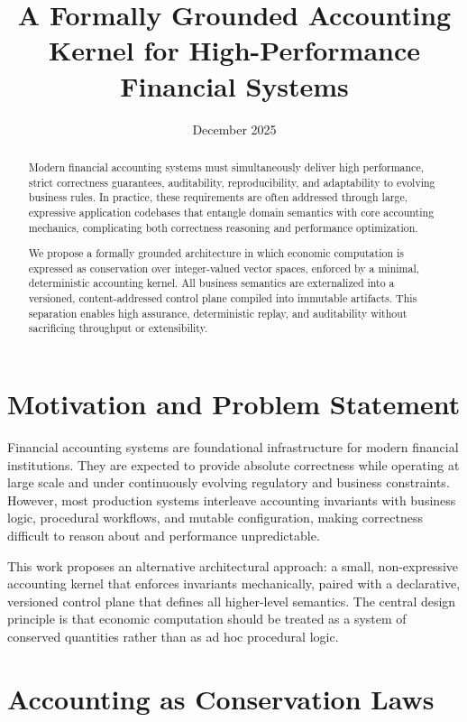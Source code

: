 \documentclass[11pt]{article}
\title{A Formally Grounded Accounting Kernel for High-Performance Financial Systems}
\author{}
\date{December 2025}
\begin{document}
\maketitle

\begin{abstract}
Modern financial accounting systems must simultaneously deliver high performance,
strict correctness guarantees, auditability, reproducibility, and adaptability to
evolving business rules. In practice, these requirements are often addressed through
large, expressive application codebases that entangle domain semantics with core
accounting mechanics, complicating both correctness reasoning and performance
optimization.

We propose a formally grounded architecture in which economic computation is expressed
as conservation over integer-valued vector spaces, enforced by a minimal, deterministic
accounting kernel. All business semantics are externalized into a versioned,
content-addressed control plane compiled into immutable artifacts. This separation
enables high assurance, deterministic replay, and auditability without sacrificing
throughput or extensibility.
\end{abstract}

\section{Motivation and Problem Statement}

Financial accounting systems are foundational infrastructure for modern financial
institutions. They are expected to provide absolute correctness while operating at
large scale and under continuously evolving regulatory and business constraints.
However, most production systems interleave accounting invariants with business logic,
procedural workflows, and mutable configuration, making correctness difficult to
reason about and performance unpredictable.

This work proposes an alternative architectural approach: a small, non-expressive
accounting kernel that enforces invariants mechanically, paired with a declarative,
versioned control plane that defines all higher-level semantics. The central design
principle is that economic computation should be treated as a system of conserved
quantities rather than as ad hoc procedural logic.

\section{Accounting as Conservation Laws}
\end{document}
